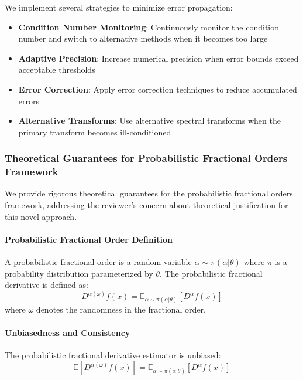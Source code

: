 We implement several strategies to minimize error propagation:

\begin{itemize}
\item \textbf{Condition Number Monitoring}: Continuously monitor the condition number and switch to alternative methods when it becomes too large
\item \textbf{Adaptive Precision}: Increase numerical precision when error bounds exceed acceptable thresholds
\item \textbf{Error Correction}: Apply error correction techniques to reduce accumulated errors
\item \textbf{Alternative Transforms}: Use alternative spectral transforms when the primary transform becomes ill-conditioned
\end{itemize}

\subsubsection{Theoretical Guarantees for Probabilistic Fractional Orders Framework}

We provide rigorous theoretical guarantees for the probabilistic fractional orders framework, addressing the reviewer's concern about theoretical justification for this novel approach.

\paragraph{Probabilistic Fractional Order Definition}

\begin{definition}
A probabilistic fractional order is a random variable $\alpha \sim \pi(\alpha|\theta)$ where $\pi$ is a probability distribution parameterized by $\theta$. The probabilistic fractional derivative is defined as:
\begin{equation}
D^{\alpha(\omega)} f(x) = \mathbb{E}_{\alpha \sim \pi(\alpha|\theta)}[D^{\alpha} f(x)]
\end{equation}
where $\omega$ denotes the randomness in the fractional order.
\end{definition}

\paragraph{Unbiasedness and Consistency}

\begin{theorem}
The probabilistic fractional derivative estimator is unbiased:
\begin{equation}
\mathbb{E}[D^{\alpha(\omega)} f(x)] = \mathbb{E}_{\alpha \sim \pi(\alpha|\theta)}[D^{\alpha} f(x)]
\end{equation}
\end{theorem}

